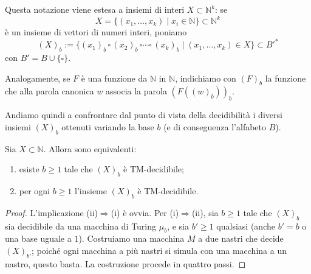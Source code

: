 Questa notazione viene estesa a insiemi di interi $X\subset\mathbb{N}^k$: se
\[
X=\{(x_1,\dots,x_k)\mid x_i\in\mathbb{N}\}\subset\mathbb{N}^k
\]
è un insieme di vettori di numeri interi, poniamo
\[
(X)_b:=\{(x_1)_b\,\square\,(x_2)_b\,\square\cdots\square\,(x_k)_b\mid (x_1,\dots,x_k)\in X\}\subset B'^*
\]
con $B'=B\cup\{\square\}$.

Analogamente, se $F$ è una funzione da $\mathbb{N}$ in $\mathbb{N}$, indichiamo con $(F)_b$ la funzione che alla parola canonica $w$ associa la parola $(F((w)_b))_b$.

Andiamo quindi a confrontare dal punto di vista della decidibilità i diversi insiemi $(X)_b$ ottenuti variando la base $b$ (e di conseguenza l'alfabeto $B$).

\begin{prop}
\label{prop:basi}
Sia $X\subset\mathbb{N}$. Allora sono equivalenti:
\begin{enumerate}
    \item[(i)] esiste $b\geq 1$ tale che $(X)_b$ è TM-decidibile;
    \item[(ii)] per ogni $b\geq 1$ l'insieme $(X)_b$ è TM-decidibile.
\end{enumerate}

\begin{proof}
L'implicazione (ii)$\Rightarrow$(i) è ovvia. Per (i)$\Rightarrow$(ii), sia $b\geq 1$ tale che $(X)_b$ sia decidibile da una macchina di Turing $\mu_b$, e sia $b'\geq 1$ qualsiasi (anche $b'=b$ o una base uguale a $1$). Costruiamo una macchina $M$ a due nastri che decide $(X)_{b'}$; poiché ogni macchina a più nastri si simula con una macchina a un nastro, questo basta. La costruzione procede in quattro passi.


\end{proof}
\end{prop}
